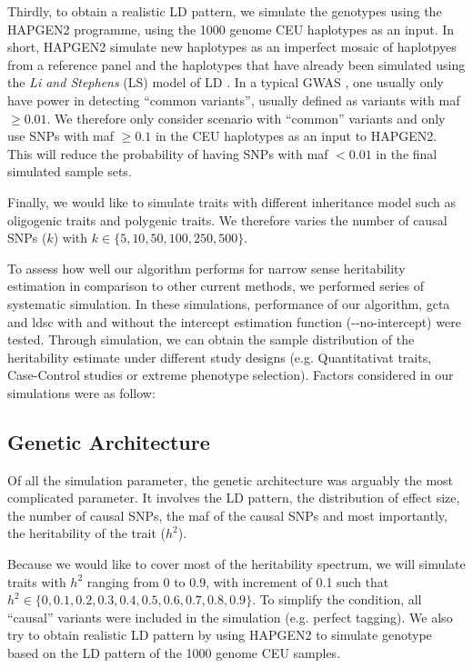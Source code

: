 		Thirdly, to obtain a realistic \gls{LD} pattern, we simulate the genotypes using the HAPGEN2 programme\citep{Su2011}, using the 1000 genome \gls{CEU} haplotypes as an input.
		In short, HAPGEN2 simulate new haplotypes as an imperfect mosaic of haplotpyes from a reference panel and the haplotypes that have already been simulated using the \textit{Li and Stephens} (LS) model of \gls{LD} \citep{Li2003}.
		In a typical \gls{GWAS} , one usually only have power in detecting ``common variants'', usually defined as variants with \gls{maf} $\ge 0.01$.
		We therefore only consider scenario with ``common'' variants and only use \glspl{SNP} with \gls{maf} $\ge0.1$ in the \gls{CEU} haplotypes as an input to HAPGEN2. 
		This will reduce the probability of having \glspl{SNP} with \gls{maf} $<0.01$ in the final simulated sample sets.
		
		Finally, we would like to simulate traits with different inheritance model such as oligogenic traits and polygenic traits.
		We therefore varies the number of causal \glspl{SNP} ($k$) with $k\in\{5, 10, 50, 100, 250, 500\}$.
		
		
		To assess how well our algorithm performs for narrow sense heritability estimation in comparison to other current methods, we performed series of systematic simulation.
		In these simulations, performance of our algorithm, \gls{gcta} \citep{Yang2011} and \gls{ldsc} \citep{Bulik-Sullivan2015} with and without the intercept estimation function (-{}-no-intercept) were tested.
		Through simulation, we can obtain the sample distribution of the heritability estimate under different study designs (e.g. Quantitativat traits, Case-Control studies or extreme phenotype selection). 
		Factors considered in our simulations were as follow:		
		
		
		
		\subsection{Genetic Architecture} %
		Of all the simulation parameter, the genetic architecture was arguably the most complicated parameter. 
		It involves the \gls{LD} pattern, the distribution of effect size, the number of causal \glspl{SNP}, the \gls{maf} of the causal \glspl{SNP} and most importantly, the heritability of the trait ($h^2$).
		
		Because we would like to cover most of the heritability spectrum, we will simulate traits with $h^2$ ranging from 0 to 0.9, with increment of 0.1 such that $h^2 \in \{0,\allowbreak 0.1,\allowbreak 0.2,\allowbreak 0.3,\allowbreak 0.4,\allowbreak 0.5,\allowbreak 0.6,\allowbreak 0.7,\allowbreak 0.8,\allowbreak 0.9\}$.
		To simplify the condition, all ``causal'' variants were included in the simulation (e.g. perfect tagging).
		We also try to obtain realistic \gls{LD} pattern by using HAPGEN2\citep{Su2011} to simulate genotype based on the \gls{LD} pattern of the 1000 genome \gls{CEU} samples. 
		
